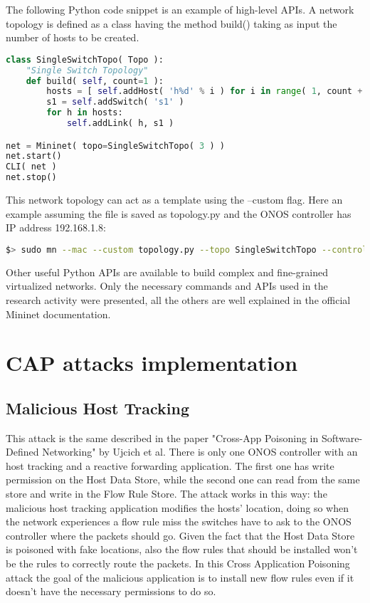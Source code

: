 \documentclass[a4paper,10pt]{memoir}
\begin{document}
The following Python code snippet is an example of high-level APIs. A network topology is defined as a class having the method build() taking as input the number of hosts to be created.
\begin{lstlisting}[language=python]
class SingleSwitchTopo( Topo ):
    "Single Switch Topology"
    def build( self, count=1 ):
        hosts = [ self.addHost( 'h%d' % i ) for i in range( 1, count + 1 ) ]
        s1 = self.addSwitch( 's1' )
        for h in hosts: 
            self.addLink( h, s1 )

net = Mininet( topo=SingleSwitchTopo( 3 ) )
net.start()
CLI( net )
net.stop()
\end{lstlisting}

This network topology can act as a template using the --custom flag. Here an example assuming the file is saved as topology.py and the ONOS controller has IP address 192.168.1.8:
\begin{lstlisting}[language=bash]
  $> sudo mn --mac --custom topology.py --topo SingleSwitchTopo --controller remote,ip=192.168.1.8 --switch ovs,protocols=OpenFlow13
\end{lstlisting}

Other useful Python APIs are available to build complex and fine-grained virtualized networks. Only the necessary commands and APIs used in the research activity were presented, all the others are well explained in the official Mininet documentation. 

\clearpage


\section{CAP attacks implementation}

\subsection{Malicious Host Tracking}
This attack is the same described in the paper "Cross-App Poisoning in Software-Defined Networking" by Ujcich et al. There is only one ONOS controller with an host tracking and a reactive forwarding application. The first one has write permission on the Host Data Store, while the second one can read from the same store and write in the Flow Rule Store. The attack works in this way: the malicious host tracking application modifies the hosts' location, doing so when the network experiences a flow rule miss the switches have to ask to the ONOS controller where the packets should go. Given the fact that the Host Data Store is poisoned with fake locations, also the flow rules that should be installed won't be the rules to correctly route the packets. In this Cross Application Poisoning attack the goal of the malicious application is to install new flow rules even if it doesn't have the necessary permissions to do so.
\end{document}
